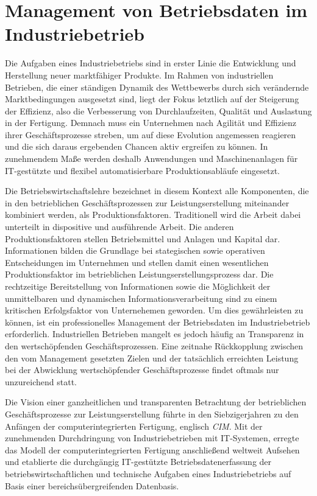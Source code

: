 \section{Management von Betriebsdaten im Industriebetrieb}\label{sec:usecase}
Die Aufgaben eines Industriebetriebs sind in erster Linie die Entwicklung und Herstellung neuer marktfähiger Produkte. 
Im Rahmen von industriellen Betrieben, die einer ständigen Dynamik des Wettbewerbs durch sich verändernde Marktbedingungen ausgesetzt sind, liegt der Fokus letztlich auf der Steigerung der Effizienz, also die Verbesserung von Durchlaufzeiten, Qualität und Auslastung in der Fertigung.
\cite{Erlach.2010}
Demnach muss ein Unternehmen nach Agilität und Effizienz ihrer Geschäftsprozesse streben, um auf diese Evolution angemessen reagieren und die sich daraus ergebenden Chancen aktiv ergreifen zu können.
 In zunehmendem Maße werden deshalb Anwendungen und Maschinenanlagen für \ac{IT}-gestützte und flexibel automatisierbare Produktionsabläufe eingesetzt. 
\cite{Erlach.2010}

Die Betriebswirtschaftslehre bezeichnet in diesem Kontext alle Komponenten, die in den betrieblichen Geschäftsprozessen zur Leistungserstellung miteinander kombiniert werden, als Produktionsfaktoren. 
Traditionell wird die Arbeit dabei unterteilt in dispositive und ausführende Arbeit. Die anderen Produktionsfaktoren stellen Betriebsmittel und Anlagen und Kapital dar.
\cite{Kanel.2018}
Informationen bilden die Grundlage bei stategischen sowie operativen Entscheidungen im Unternehmen und stellen damit einen wesentlichen Produktionsfaktor im betrieblichen Leistungserstellungsprozess dar.
\cite{Scheer.1990}
Die rechtzeitige Bereitstellung von Informationen sowie die Möglichkeit der unmittelbaren und dynamischen Informationsverarbeitung sind zu einem kritischen Erfolgsfaktor von Unternehemen geworden. 
Um dies gewährleisten zu können, ist ein professionelles Management der Betriebsdaten im Industriebetrieb erforderlich.
\cite{Dippold.2005}
Industriellen Betrieben mangelt es jedoch häufig an Transparenz in den wertschöpfenden Geschäftsprozessen.
Eine zeitnahe Rückkopplung zwischen den vom Management gesetzten Zielen und der tatsächlich erreichten Leistung bei der Abwicklung wertschöpfender Geschäftsprozesse findet oftmals nur unzureichend statt. 
\cite{Grauer.2019}

Die Vision einer ganzheitlichen und transparenten Betrachtung der betrieblichen Geschäftsprozesse zur Leistungserstellung führte in den Siebzigerjahren zu den Anfängen der computerintegrierten Fertigung, englisch \textit{\acf{CIM}}. 
Mit der zunehmenden Durchdringung von Industriebetrieben mit \ac{IT}-Systemen, erregte das Modell der computerintegrierten Fertigung anschließend weltweit Aufsehen und etablierte die durchgängig \ac{IT}-gestützte Betriebsdatenerfassung der betriebswirtschaftlichen und technische Aufgaben eines Industriebetriebs auf Basis einer bereichsübergreifenden Datenbasis.
\cite{Scheer.1990}

